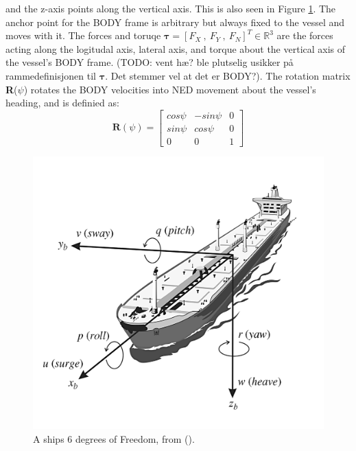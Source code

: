 and the z-axis points along the vertical axis. This is also seen in Figure \ref{FIG: Ship DOF}.
The anchor point for the BODY frame is arbitrary but always fixed to the vessel and moves with it. 
The forces and toruqe $\bm{\tau} = [F_{X}\ , \ F_{Y} \ , \ F_{N}]^T \in \mathbb{R}^{3}$ are the forces acting along
the logitudal axis, lateral axis, and torque about the vertical axis of the vessel's BODY frame. (TODO: vent hæ? ble plutselig usikker på rammedefinisjonen
til $\bm{\tau}$. Det stemmer vel at det er BODY?). The rotation matrix \textbf{R}($\psi$) rotates the BODY velocities into \gls{NED} movement about the
vessel's heading, and is definied as:
\begin{equation}
    \textbf{R}(\psi) = \begin{bmatrix}
                        cos\psi &   -sin\psi & 0\\
                        sin\psi & cos\psi    & 0\\
                        0       &   0        & 1
                        \end{bmatrix}
\end{equation}


\begin{figure}[ht]
    \centering
    \includegraphics[height=0.35\textheight]{Images/SHIPDOF_FOSSEN.png}
    \caption{A ships 6 degrees of Freedom, from (\cite{fossen2011handbook}).} %
    \label{FIG: Ship DOF}
\end{figure}


